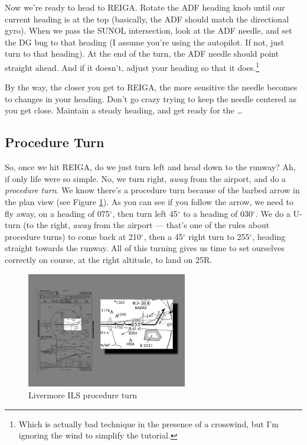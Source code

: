 Now we're ready to head to REIGA.  Rotate the ADF heading knob until
our current heading is at the top (basically, the ADF should match the
directional gyro).  When we pass the SUNOL intersection, look at the
ADF needle, and set the DG bug to that heading (I assume you're using
the autopilot.  If not, just turn to that heading).  At the end of the
turn, the ADF needle should point straight ahead.  And if it doesn't,
adjust your heading so that it does.\footnote{Which is actually bad
  technique in the presence of a crosswind, but I'm ignoring the wind
  to simplify the tutorial.}

By the way, the closer you get to REIGA, the more sensitive the needle
becomes to changes in your heading.  Don't go crazy trying to keep the
needle centered as you get close.  Maintain a steady heading, and get
ready for the \ldots{}

\subsection{Procedure Turn}

So, once we hit REIGA, do we just turn left and head down to the
runway?  Ah, if only life were so simple.  No, we turn right,
\emph{away} from the airport, and do a \emph{procedure turn}.  We know
there's a procedure turn because of the barbed arrow in the plan view
(see Figure \ref{fig:PT}).  As you can see if you follow the arrow, we
need to fly away, on a heading of 075$^\circ$, then turn left
45$^\circ$ to a heading of 030$^\circ$.  We do a U-turn (to the right,
\emph{away} from the airport --- that's one of the rules about
procedure turns) to come back at 210$^\circ$, then a 45$^\circ$ right
turn to 255$^\circ$, heading straight towards the runway.  All of this
turning gives us time to set ourselves correctly on course, at the
right altitude, to land on 25R.

\begin{figure}
  \begin{center}
    \includegraphics[width=7cm]{img/PT}
    \caption{Livermore ILS procedure turn}
    \label{fig:PT}
  \end{center}
\end{figure}

